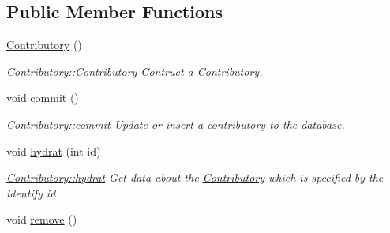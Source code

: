 \subsection*{Public Member Functions}
\begin{DoxyCompactItemize}
\item 
\hypertarget{classContributory_a5991c01efd2dedcbbddde252c48d7af8}{\hyperlink{classContributory_a5991c01efd2dedcbbddde252c48d7af8}{Contributory} ()}\label{classContributory_a5991c01efd2dedcbbddde252c48d7af8}

\begin{DoxyCompactList}\small\item\em \hyperlink{classContributory_a5991c01efd2dedcbbddde252c48d7af8}{Contributory\+::\+Contributory} Contruct a \hyperlink{classContributory}{Contributory}. \end{DoxyCompactList}\item 
\hypertarget{classContributory_a5c09902237bba780b594129dc2fa60d6}{void \hyperlink{classContributory_a5c09902237bba780b594129dc2fa60d6}{commit} ()}\label{classContributory_a5c09902237bba780b594129dc2fa60d6}

\begin{DoxyCompactList}\small\item\em \hyperlink{classContributory_a5c09902237bba780b594129dc2fa60d6}{Contributory\+::commit} Update or insert a contributory to the database. \end{DoxyCompactList}\item 
void \hyperlink{classContributory_a2b834e0288c93ba9ed70acf7a0b8c32d}{hydrat} (int id)
\begin{DoxyCompactList}\small\item\em \hyperlink{classContributory_a2b834e0288c93ba9ed70acf7a0b8c32d}{Contributory\+::hydrat} Get data about the \hyperlink{classContributory}{Contributory} which is specified by the identify {\itshape id} \end{DoxyCompactList}\item 
\hypertarget{classContributory_a59641dbc35947c31eb841b46fed6130f}{void \hyperlink{classContributory_a59641dbc35947c31eb841b46fed6130f}{remove} ()}\label{classContributory_a59641dbc35947c31eb841b46fed6130f}


\end{DoxyCompactItemize}
